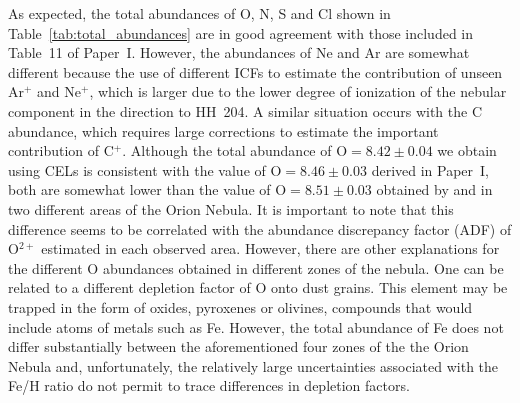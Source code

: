 \documentclass[twocolumn]{aastex63}
\newcommand{\cesar}[1]{{\color{red}C: #1}}
\begin{document}
As expected, the total abundances of O, N, S and Cl shown in Table~\ref{tab:total_abundances} are in good agreement with those included in Table~11 of Paper~I. However, the abundances of Ne and Ar are somewhat different because the use of different ICFs to estimate the contribution of unseen Ar$^{+}$ and Ne$^{+}$, which is larger due to the lower degree of ionization of the nebular component in the direction to HH~204. A similar situation occurs with the C abundance, which requires large corrections to estimate the important contribution of C$^+$. Although the total abundance of $\text{O}=8.42 \pm 0.04$ we obtain using CELs is consistent with the value of  $\text{O}=8.46 \pm 0.03$ derived in Paper~I, both are somewhat lower than the value of $\text{O}=8.51 \pm 0.03$ obtained by \citet{Esteban04} and \citet{mesadelgado09} in two different areas of the Orion Nebula. It is important to note that this difference seems to be correlated with the abundance discrepancy factor (ADF) of O$^{2+}$ estimated in each observed area. 
However, there are other explanations for the different O abundances obtained in different zones of the nebula. One can be related to a different depletion factor of O onto dust grains. This element may be trapped in the form of oxides, pyroxenes or olivines, compounds that would include atoms of metals such as Fe. However, the total abundance of Fe does not differ substantially between the aforementioned four zones of the the Orion Nebula and, unfortunately, the relatively large uncertainties associated with the Fe/H ratio do not permit to trace differences in depletion factors. %
\end{document}
